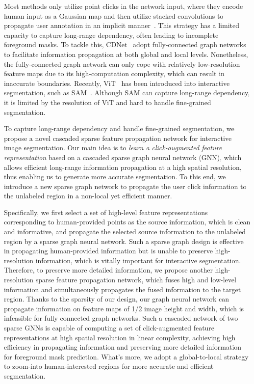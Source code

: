 \documentclass{bmvc2k}
\begin{document}
Most methods only utilize point clicks in the network input, where they encode human input as a Gaussian map and then utilize stacked convolutions to propagate user annotation in an implicit manner~\cite{xu2016deep,lin2020interactive}. This strategy has a limited capacity to capture long-range dependency, often leading to incomplete foreground masks. 
To tackle this, CDNet~\cite{chen2021conditional} adopt fully-connected graph networks~\cite{wang2018non} to facilitate information propagation at both global and local levels. Nonetheless, the fully-connected graph network can only cope with relatively low-resolution feature maps due to its high-computation complexity, which can result in inaccurate boundaries. Recently, ViT~\cite{dosovitskiy2020image} has been introduced into interactive segmentation, such as SAM~\cite{kirillov2023segment}. Although SAM can capture long-range dependency, it is limited by the resolution of ViT and hard to handle fine-grained segmentation. 



To capture long-range dependency and handle fine-grained segmentation, we propose a novel cascaded sparse feature propagation network for interactive image segmentation. Our main idea is to \textit{learn a click-augmented feature representation} based on a cascaded sparse graph neural network (GNN), which allows efficient long-range information propagation at a high spatial resolution, thus enabling us to generate more accurate segmentation. To this end, we introduce a new sparse graph network to propagate the user click information to the unlabeled region in a non-local yet efficient manner. 

Specifically, we first select a set of high-level feature representations corresponding to human-provided points as the source information, which is clean and informative, and propagate the selected source information to the unlabeled region by a sparse graph neural network. Such a sparse graph design is effective in propagating human-provided information but is unable to preserve high-resolution information, which is vitally important for interactive segmentation. Therefore, to preserve more detailed information, we propose another high-resolution sparse feature propagation network, which fuses high and low-level information and simultaneously propagates the fused information to the target region. Thanks to the sparsity of our design, our graph neural network can propagate information on feature maps of 1/2 image height and width, which is infeasible for fully connected graph networks. Such a cascaded network of two sparse GNNs is capable of computing a set of click-augmented feature representations at high spatial resolution in linear complexity, achieving high efficiency in propagating information and preserving more detailed information for foreground mask prediction. What's more, we adopt a global-to-local strategy to zoom-into human-interested regions for more accurate and efficient segmentation.
\end{document}
